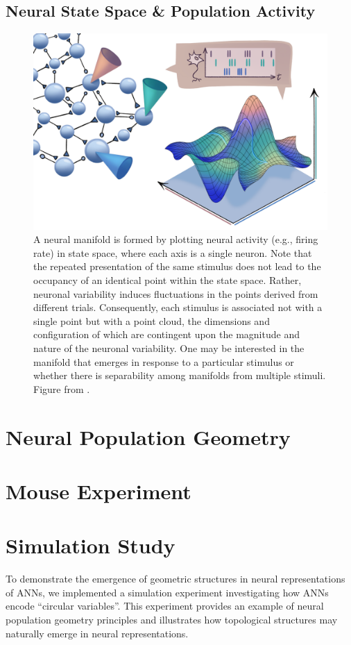 \documentclass[11pt,a4paper]{article}
\begin{document}
\subsection{Neural State Space \& Population Activity}
\begin{figure}
    \centering
    \includegraphics[width=0.75\linewidth]{manifold_schematic.png}
    \caption{A neural manifold is formed by plotting neural activity (e.g., firing rate) in state space, where each axis is a single neuron. Note that the repeated presentation of the same stimulus does not lead to the occupancy of an identical point within the state space. Rather, neuronal variability induces fluctuations in the points derived from different trials. Consequently, each stimulus is associated not with a single point but with a point cloud, the dimensions and configuration of which are contingent upon the magnitude and nature of the neuronal variability. One may be interested in the manifold that emerges in response to a particular stimulus or whether there is separability among manifolds from multiple stimuli. Figure from \cite{Perich2024}.}
    \label{fig:manifolds}
\end{figure}


\section{Neural Population Geometry}

\section{Mouse Experiment}

\section{Simulation Study}

To demonstrate the emergence of geometric structures in neural representations of ANNs, we implemented a simulation experiment investigating how ANNs encode ``circular variables''. This experiment provides an example of neural population geometry principles and illustrates how topological structures may naturally emerge in neural representations.
\end{document}
